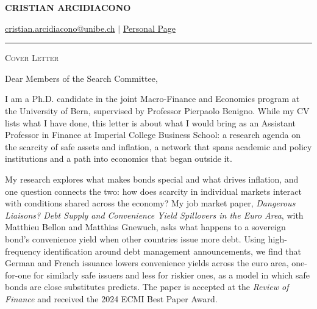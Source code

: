 \documentclass[11pt]{article}
\begin{document}
 
\begin{center}
    \textbf{\large \scshape CRISTIAN ARCIDIACONO}
\end{center}

\begin{center}
    {\href{mailto:cristian.arcidiacono@unibe.ch}{cristian.arcidiacono@unibe.ch} $\vert$ \href{https://sites.google.com/view/cristian-arcidiacono/home}{Personal Page}}
\end{center}
\vspace{-0.2cm}
\noindent\rule{\textwidth}{0.4pt}

\vspace{0.2cm}

\begin{center}
    {\large \scshape Cover Letter}
\end{center}

\vspace{0.3cm}

Dear Members of the Search Committee,

I am a Ph.D. candidate in the joint Macro-Finance and Economics program at the University of Bern, supervised by Professor Pierpaolo Benigno. While my CV lists what I have done, this letter is about what I would bring as an Assistant Professor in Finance at Imperial College Business School: a research agenda on the scarcity of safe assets and inflation, a network that spans academic and policy institutions and a path into economics that began outside it.

My research explores what makes bonds special and what drives inflation, and one question connects the two: how does scarcity in individual markets interact with conditions shared across the economy? My job market paper, \textit{Dangerous Liaisons? Debt Supply and Convenience Yield Spillovers in the Euro Area}, with Matthieu Bellon and Matthias Gnewuch, asks what happens to a sovereign bond's convenience yield when other countries issue more debt. Using high-frequency identification around debt management announcements, we find that German and French issuance lowers convenience yields across the euro area, one-for-one for similarly safe issuers and less for riskier ones, as a model in which safe bonds are close substitutes predicts. The paper is accepted at the \textit{Review of Finance} and received the 2024 ECMI Best Paper Award.
\end{document}

